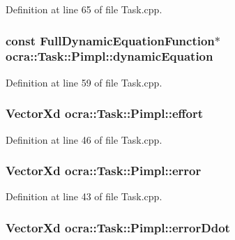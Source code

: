 Definition at line 65 of file Task.\+cpp.

\subsubsection[{\texorpdfstring{dynamic\+Equation}{dynamicEquation}}]{\setlength{\rightskip}{0pt plus 5cm}const {\bf Full\+Dynamic\+Equation\+Function}$\ast$ ocra\+::\+Task\+::\+Pimpl\+::dynamic\+Equation}\hypertarget{structocra_1_1Task_1_1Pimpl_ae0ea7e23e7027d49ab4f7b9e4bac4e77}{}\label{structocra_1_1Task_1_1Pimpl_ae0ea7e23e7027d49ab4f7b9e4bac4e77}


Definition at line 59 of file Task.\+cpp.

\subsubsection[{\texorpdfstring{effort}{effort}}]{\setlength{\rightskip}{0pt plus 5cm}Vector\+Xd ocra\+::\+Task\+::\+Pimpl\+::effort}\hypertarget{structocra_1_1Task_1_1Pimpl_a559f2cba2b711b32d5dad8a0e7a4deed}{}\label{structocra_1_1Task_1_1Pimpl_a559f2cba2b711b32d5dad8a0e7a4deed}


Definition at line 46 of file Task.\+cpp.

\subsubsection[{\texorpdfstring{error}{error}}]{\setlength{\rightskip}{0pt plus 5cm}Vector\+Xd ocra\+::\+Task\+::\+Pimpl\+::error}\hypertarget{structocra_1_1Task_1_1Pimpl_a1e505b965de1375219740303422034ed}{}\label{structocra_1_1Task_1_1Pimpl_a1e505b965de1375219740303422034ed}


Definition at line 43 of file Task.\+cpp.

\subsubsection[{\texorpdfstring{error\+Ddot}{errorDdot}}]{\setlength{\rightskip}{0pt plus 5cm}Vector\+Xd ocra\+::\+Task\+::\+Pimpl\+::error\+Ddot}\hypertarget{structocra_1_1Task_1_1Pimpl_aba21dcd508621e5fbfc9d53f5f38a6d6}{}\label{structocra_1_1Task_1_1Pimpl_aba21dcd508621e5fbfc9d53f5f38a6d6}


